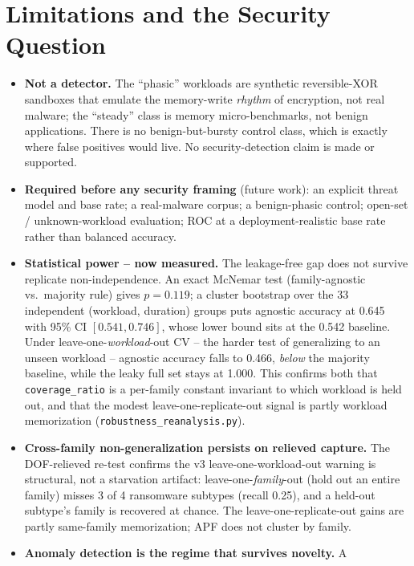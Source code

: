 \documentclass[conference]{IEEEtran}
\begin{document}
\section{Limitations and the Security Question}
\begin{itemize}
  \item \textbf{Not a detector.} The ``phasic'' workloads are synthetic
        reversible-XOR sandboxes that emulate the memory-write \emph{rhythm} of
        encryption, not real malware; the ``steady'' class is memory
        micro-benchmarks, not benign applications. There is no benign-but-bursty
        control class, which is exactly where false positives would live. No
        security-detection claim is made or supported.
  \item \textbf{Required before any security framing} (future work): an explicit
        threat model and base rate; a real-malware corpus; a benign-phasic
        control; open-set / unknown-workload evaluation; ROC at a
        deployment-realistic base rate rather than balanced accuracy.
  \item \textbf{Statistical power -- now measured.} The leakage-free gap does not
        survive replicate non-independence. An exact McNemar test (family-agnostic
        vs.\ majority rule) gives $p=0.119$; a cluster bootstrap over the 33
        independent (workload, duration) groups puts agnostic accuracy at 0.645
        with 95\% CI $[0.541, 0.746]$, whose lower bound sits at the 0.542
        baseline. Under leave-one-\emph{workload}-out CV -- the harder test of
        generalizing to an unseen workload -- agnostic accuracy falls to 0.466,
        \emph{below} the majority baseline, while the leaky full set stays at
        1.000. This confirms both that \texttt{coverage\_ratio} is a per-family
        constant invariant to which workload is held out, and that the modest
        leave-one-replicate-out signal is partly workload memorization
        (\texttt{robustness\_reanalysis.py}).
  \item \textbf{Cross-family non-generalization persists on relieved capture.}
        The DOF-relieved re-test confirms the v3 leave-one-workload-out warning is
        structural, not a starvation artifact: leave-one-\emph{family}-out (hold
        out an entire family) misses 3 of 4 ransomware subtypes (recall 0.25), and
        a held-out subtype's family is recovered at chance. The
        leave-one-replicate-out gains are partly same-family memorization; APF does
        not cluster by family.
  \item \textbf{Anomaly detection is the regime that survives novelty.} A

\end{itemize}
\end{document}
